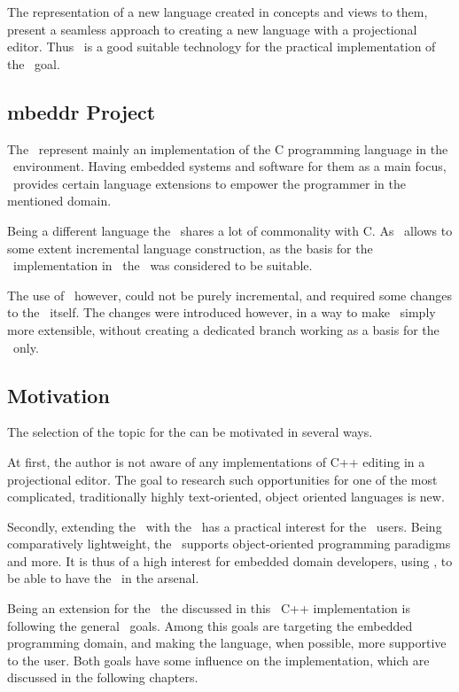 The representation of a new language created in concepts and views to them, present a seamless approach to creating a new language with a projectional editor.
Thus \jbmps\ is a good suitable technology for the practical implementation of the \MT\ goal.

\subsection{mbeddr Project}

The \mbdrp\ represent mainly an implementation of the C programming language in the \jbmps\ environment. Having embedded systems
and software for them as a main focus, \mbdr\ provides certain language extensions to empower the programmer in the mentioned domain. 

Being a different language the \cpppl\ shares a lot of commonality with C. As \jbmps\ allows to some extent incremental language construction,
as the basis for the \cpppl\ implementation in \jbmps\ the \mbdrp\ was considered to be suitable. 

The use of \mbdr\, however, could not be purely incremental, and required some changes to the \mbdr\ itself. 
The changes were introduced however, in a way to make \mbdr\ simply more extensible, 
without creating a dedicated branch working as a basis for the \cpppl\ only.

\subsection{Motivation}

The selection of the topic for the \MT can be motivated in several ways.

At first, the author is not aware of any implementations of C++ editing in a projectional editor. The goal to research
such opportunities for one of the most complicated, traditionally highly text-oriented, object oriented languages is
new.

Secondly, extending the \mbdrp\ with the \cpppl\ has a practical interest for the \mbdrp\ users. Being comparatively lightweight,
the \cpppl\ supports object-oriented programming paradigms and more. It is thus of a high interest for embedded domain developers, using \mbdr,
to be able to have the \cpppl\ in the arsenal.

Being an extension for the \mbp\ the discussed in this \MT\ C++ implementation is following the general \mb\ goals. Among this goals are targeting
the embedded programming domain, and making the language, when possible, more supportive to the user. Both goals have some influence on the implementation,
which are discussed in the following chapters.
